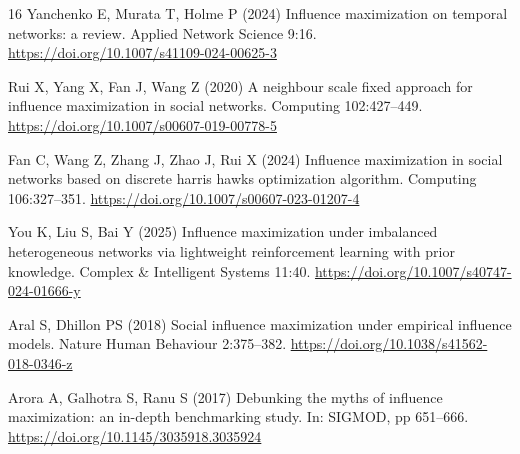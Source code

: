 \documentclass[smallextended]{svjour3}
\begin{document}
\begin{thebibliography}{16}
 Yanchenko E, Murata T, Holme P (2024) Influence maximization on temporal networks: a review. Applied Network Science 9:16. \url{https://doi.org/10.1007/s41109-024-00625-3}

 Rui X, Yang X, Fan J, Wang Z (2020) A neighbour scale fixed approach for influence maximization in social networks. Computing 102:427--449. \url{https://doi.org/10.1007/s00607-019-00778-5}

 Fan C, Wang Z, Zhang J, Zhao J, Rui X (2024) Influence maximization in social networks based on discrete harris hawks optimization algorithm. Computing 106:327--351. \url{https://doi.org/10.1007/s00607-023-01207-4}

 You K, Liu S, Bai Y (2025) Influence maximization under imbalanced heterogeneous networks via lightweight reinforcement learning with prior knowledge. Complex \& Intelligent Systems 11:40. \url{https://doi.org/10.1007/s40747-024-01666-y}

 Aral S, Dhillon PS (2018) Social influence maximization under empirical influence models. Nature Human Behaviour 2:375--382. \url{https://doi.org/10.1038/s41562-018-0346-z}

 Arora A, Galhotra S, Ranu S (2017) Debunking the myths of influence maximization: an in-depth benchmarking study. In: SIGMOD, pp 651--666. \url{https://doi.org/10.1145/3035918.3035924}
\end{thebibliography}
\end{document}
